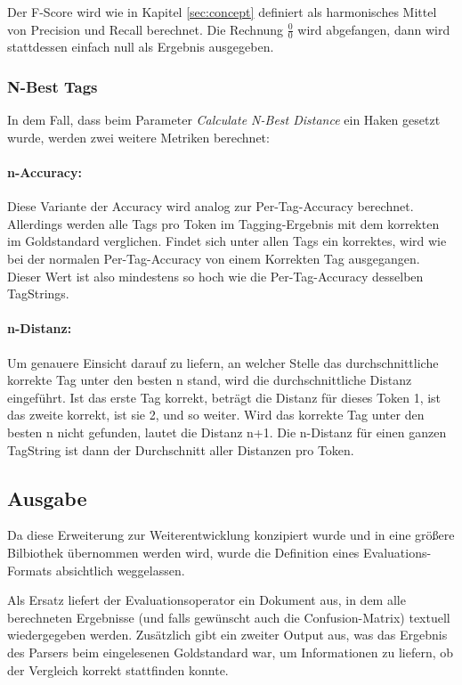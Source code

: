 Der F-Score wird wie in Kapitel \ref{sec:concept} definiert als harmonisches Mittel von Precision und Recall berechnet. Die Rechnung $\frac{0}{0}$ wird abgefangen, dann wird stattdessen einfach null als Ergebnis ausgegeben.

\subsubsection{N-Best Tags}
In dem Fall, dass beim Parameter \textit{Calculate N-Best Distance} ein Haken gesetzt wurde, werden zwei weitere Metriken berechnet:

\paragraph{n-Accuracy:} Diese Variante der Accuracy wird analog zur Per-Tag-Accuracy berechnet. Allerdings werden alle Tags pro Token im Tagging-Ergebnis mit dem korrekten im Goldstandard verglichen. Findet sich unter allen Tags ein korrektes, wird wie bei der normalen Per-Tag-Accuracy von einem Korrekten Tag ausgegangen. Dieser Wert ist also mindestens so hoch wie die Per-Tag-Accuracy desselben TagStrings.
\paragraph{n-Distanz:} Um genauere Einsicht darauf zu liefern, an welcher Stelle das durchschnittliche korrekte Tag unter den besten n stand, wird die durchschnittliche Distanz eingeführt. Ist das erste Tag korrekt, beträgt die Distanz für dieses Token 1, ist das zweite korrekt, ist sie 2, und so weiter. Wird das  korrekte Tag unter den besten n nicht gefunden, lautet die Distanz n+1. Die n-Distanz für einen ganzen TagString ist dann der Durchschnitt aller Distanzen pro Token.

\subsection{Ausgabe}
\label{sec:impl:eval:out}

Da diese Erweiterung zur Weiterentwicklung konzipiert wurde und in eine größere Bilbiothek übernommen werden wird, wurde die Definition eines Evaluations-Formats absichtlich weggelassen.

Als Ersatz liefert der Evaluationsoperator ein Dokument aus, in dem alle berechneten Ergebnisse (und falls gewünscht auch die Confusion-Matrix) textuell wiedergegeben werden. Zusätzlich gibt ein zweiter Output aus, was das Ergebnis des Parsers beim eingelesenen Goldstandard war, um Informationen zu liefern, ob der Vergleich korrekt stattfinden konnte.

